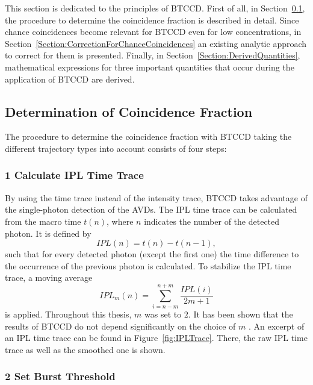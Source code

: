 This section is dedicated to the principles of \gls{BTCCD}. First of all, in Section~\ref{Section:DeterminationOfCoincidenceFraction}, the procedure to determine the coincidence fraction is described in detail. Since chance coincidences become relevant for \gls{BTCCD} even for low concentrations, in Section~\ref{Section:CorrectionForChanceCoincidences} an existing analytic approach to correct for them is presented. Finally, in Section~\ref{Section:DerivedQuantities}, mathematical expressions for three important quantities that occur during the application of \gls{BTCCD} are derived.

\subsection{Determination of Coincidence Fraction} \label{Section:DeterminationOfCoincidenceFraction}

The procedure to determine the coincidence fraction with \gls{BTCCD} taking the different trajectory types into account consists of four steps:

\subsubsection*{1 Calculate \gls{IPL} Time Trace}

By using the  time trace instead of the intensity trace, \gls{BTCCD} takes advantage of the single-photon detection of the \glspl{AVD}. The \gls{IPL} time trace can be calculated from the macro time $t(n)$, where $n$ indicates the number of the detected photon. It is defined by
\begin{equation}
	IPL(n) = t(n) - t(n-1),
\end{equation}
such that for every detected photon (except the first one) the time difference to the occurrence of the previous photon is calculated. To stabilize the \gls{IPL} time trace, a moving average 
\begin{equation}
	IPL_m(n) = \sum_{i = n-m}^{n+m} \frac{IPL(i)}{2m + 1}
\end{equation}
is applied. Throughout this thesis, $m$ was set to $2$. It has been shown that the results of \gls{BTCCD} do not depend significantly on the choice of $m$ \cite{Hoefig2020}. An excerpt of an \gls{IPL} time trace can be found in Figure~\ref{fig:IPLTrace}. There, the raw \gls{IPL} time trace as well as the smoothed one is shown.

\subsubsection*{2 Set Burst Threshold}

